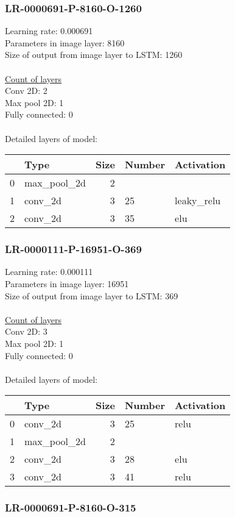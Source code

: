 \subsubsection*{LR-0000691-P-8160-O-1260}
Learning rate: 0.000691
\\Parameters in image layer: 8160
\\Size of output from image layer to LSTM: 1260
\\\\\underline{Count of layers} 
\\Conv 2D:           2\\Max pool 2D:      1\\Fully connected:  0
\\\\Detailed layers of model: \\\begin{tabular}{rlrll}
\hline
    & Type        &   Size & Number   & Activation   \\
\hline
  0 & max\_pool\_2d &      2 &          &              \\
  1 & conv\_2d     &      3 & 25       & leaky\_relu   \\
  2 & conv\_2d     &      3 & 35       & elu          \\
\hline
\end{tabular}\subsubsection*{LR-0000111-P-16951-O-369}
Learning rate: 0.000111
\\Parameters in image layer: 16951
\\Size of output from image layer to LSTM: 369
\\\\\underline{Count of layers} 
\\Conv 2D:           3\\Max pool 2D:      1\\Fully connected:  0
\\\\Detailed layers of model: \\\begin{tabular}{rlrll}
\hline
    & Type        &   Size & Number   & Activation   \\
\hline
  0 & conv\_2d     &      3 & 25       & relu         \\
  1 & max\_pool\_2d &      2 &          &              \\
  2 & conv\_2d     &      3 & 28       & elu          \\
  3 & conv\_2d     &      3 & 41       & relu         \\
\hline
\end{tabular}\subsubsection*{LR-0000691-P-8160-O-315}
